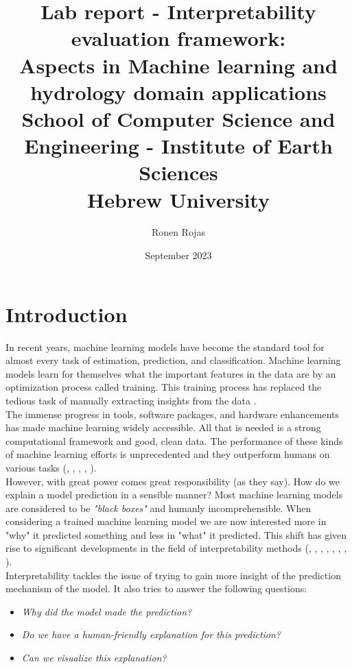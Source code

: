 \documentclass[12pt]{report}
\title{
	{Lab report - Interpretability evaluation framework: \\ Aspects in Machine learning and hydrology domain applications}\\
	{\large School of Computer Science and Engineering - 
		Institute of Earth Sciences}\\
	{\large Hebrew University} \\
	
}
\author{ 
	{Ronen Rojas}
}
\date{September 2023}
\begin{document}
\maketitle
\tableofcontents
\newpage


\newpage
\chapter{Introduction} 

In recent years, machine learning models have become the standard tool for almost every task of estimation, prediction, and classification. Machine learning models learn for themselves what the important features in the data are by an optimization process called training. This training process has replaced the tedious task of manually extracting insights from the data .\\

The immense progress in tools, software packages, and hardware enhancements has made machine learning widely accessible. All that is needed is a strong computational framework and good, clean data. The performance of these kinds of machine learning efforts is unprecedented and they outperform humans on various tasks (\cite{he2015deep}, \cite{DBLP:journals/corr/abs-1805-01890}, \cite{DBLP:journals/corr/abs-1905-01392}, \cite{DBLP:journals/corr/MnihKSGAWR13}, \cite{Silver_2016}).\\

However, with great power comes great responsibility (as they say). How do we explain a model prediction in a sensible manner? Most machine learning models are considered to be \textit{"black boxes"} and humanly incomprehensible. When considering a trained machine learning model we are now interested more in "why" it predicted something and less in "what" it predicted. This shift has given rise to significant developments in the field of interpretability methods (\cite{molnar2019}, \cite{electronics10050593}, \cite{DBLP:journals/corr/abs-2012-14261}, \cite{DBLP:journals/corr/abs-1802-00614}, \cite{DBLP:journals/corr/abs-2003-07631}, \cite{DBLP:journals/corr/abs-2007-15911}, \cite{samek2019explainable}, \cite{DBLP:journals/corr/abs-2012-15445}). \\

Interpretability tackles the issue of trying to gain more insight of the prediction mechanism of the model. It also tries to answer the following questions:
\begin{itemize}
	\item \textit{Why did the model made the prediction?}	
	\item \textit{Do we have a human-friendly explanation for this prediction?}	
	\item \textit{Can we visualize this explanation? }	
\end{itemize}
\end{document}
